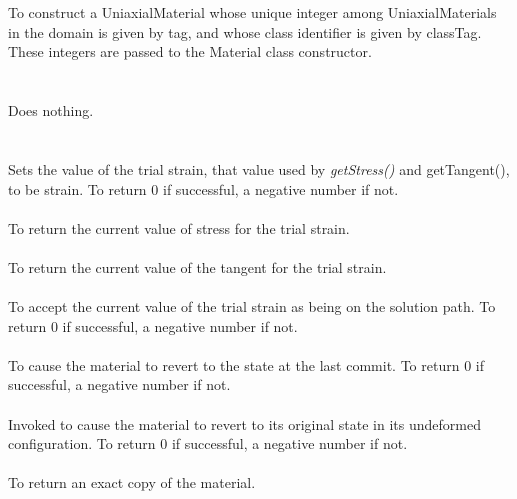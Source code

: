   \\
  \\
To construct a UniaxialMaterial whose unique integer among
UniaxialMaterials in the domain is given by \p tag, and whose class
identifier is given by \p classTag. These integers are passed to
the Material class constructor. \\

 \\
 \\
Does nothing. \\ 

 \\
  \\
Sets the value of the trial strain, that value used by {\em
getStress()} and getTangent(), to be \p strain. To
return $0$ if successful, a negative number if not. \\

 \\
To return the current value of stress for the trial strain. \\

 \\
To return the current value of the tangent for the trial strain. \\

 \\
To accept the current value of the trial strain as being on the
solution path. To return $0$ if successful, a negative number if not. \\

 \\
To cause the material to revert to the state at the last commit. To
return $0$ if successful, a negative number if not. \\

 \\
Invoked to cause the material to revert to its original state in its
undeformed configuration. To return $0$ if successful, a negative
number if not. \\

 \\
To return an exact copy of the material. \\
